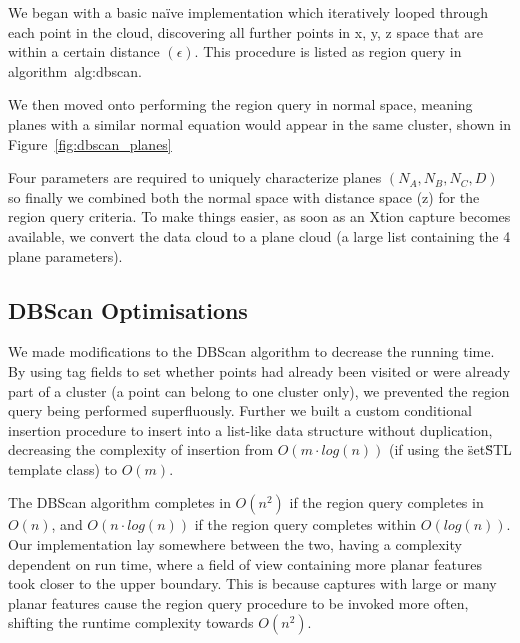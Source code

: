 \documentclass[]{article}
\begin{document}
{We began with a basic naïve implementation which iteratively looped through each point in the cloud, discovering all further points in x, y, z space that are within a certain distance  $(\epsilon)$. This procedure is listed as region query in algorithm~{alg:dbscan}.



We then moved onto performing the region query in normal space, meaning planes with a similar normal equation would appear in the same cluster, shown in Figure~\ref{fig:dbscan_planes}



Four parameters are required to uniquely characterize planes $(N_A, N_B, N_C, D)$ so finally we combined both the normal space with distance space (z) for the region query criteria. To make things easier, as soon as an Xtion capture becomes available, we convert the data cloud to a plane cloud (a large list containing the 4 plane parameters).

\subsection{DBScan Optimisations} %
\label{sub:dbscan_optimisations}


We made modifications to the DBScan algorithm to decrease the running time. By using tag fields to set whether points had already been visited or were already part of a cluster (a point can belong to one cluster only), we prevented the region query being performed superfluously. Further we built a custom conditional insertion procedure to insert into a list-like data structure without duplication, decreasing the complexity of insertion from $O(m \cdot log(n))$ (if using the \"set\" STL template class) to $O(m)$.

The DBScan algorithm completes in $O(n^2)$ if the region query completes in $O(n)$, and $O(n \cdot log(n))$ if the region query completes within $O(log(n))$. Our implementation lay somewhere between the two, having a complexity dependent on run time, where a field of view containing more planar features took closer to the upper boundary. This is because captures with large or many planar features cause the region query procedure to be invoked more often, shifting the runtime complexity towards $O(n^2)$.

}
\end{document}
